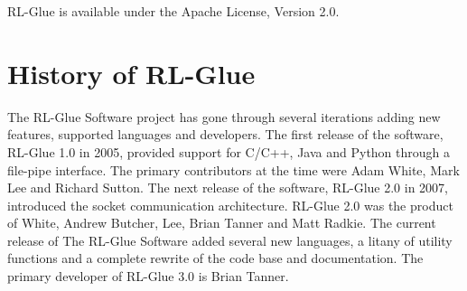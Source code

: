 \documentclass[twopage,11pt]{article}
\begin{document}
RL-Glue is available under the Apache License, Version 2.0.
	

\section{History of RL-Glue}
The RL-Glue Software project has gone through several iterations adding new features, supported languages and developers. The first release of the software, RL-Glue 1.0 in 2005, provided support for C/C++, Java and Python through a file-pipe interface. The primary contributors at the time were Adam White, Mark Lee and Richard Sutton. The next release of the software, RL-Glue 2.0 in 2007, introduced the socket communication architecture. RL-Glue 2.0 was the product of White, Andrew Butcher, Lee, Brian Tanner and Matt Radkie. The current release of The RL-Glue Software added several new languages, a litany of utility functions and a complete rewrite of the code base and documentation. The primary developer of RL-Glue 3.0 is Brian Tanner.
   



%
%




\end{document}
